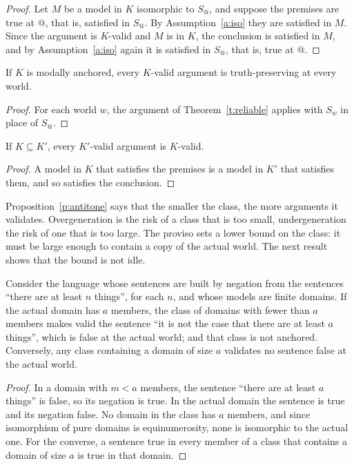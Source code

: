 \documentclass{situationist-preprint}
\begin{document}
\begin{proof}
Let $M$ be a model in $K$ isomorphic to $S_@$, and suppose the premises are true at $@$, that is, satisfied in $S_@$. By Assumption~\ref{a:iso} they are satisfied in $M$. Since the argument is $K$-valid and $M$ is in $K$, the conclusion is satisfied in $M$, and by Assumption~\ref{a:iso} again it is satisfied in $S_@$, that is, true at $@$.
\end{proof}

\begin{corollary}\label{c:nec}
If $K$ is modally anchored, every $K$-valid argument is truth-preserving at every world.
\end{corollary}

\begin{proof}
For each world $w$, the argument of Theorem~\ref{t:reliable} applies with $S_w$ in place of $S_@$.
\end{proof}

\begin{proposition}\label{p:antitone}
If $K \subseteq K'$, every $K'$-valid argument is $K$-valid.
\end{proposition}

\begin{proof}
A model in $K$ that satisfies the premises is a model in $K'$ that satisfies them, and so satisfies the conclusion.
\end{proof}

Proposition~\ref{p:antitone} says that the smaller the class, the more arguments it validates. Overgeneration is the risk of a class that is too small, undergeneration the risk of one that is too large. The proviso sets a lower bound on the class: it must be large enough to contain a copy of the actual world. The next result shows that the bound is not idle.

\begin{proposition}\label{p:over}
Consider the language whose sentences are built by negation from the sentences \enquote{there are at least $n$ things}, for each $n$, and whose models are finite domains. If the actual domain has $a$ members, the class of domains with fewer than $a$ members makes valid the sentence \enquote{it is not the case that there are at least $a$ things}, which is false at the actual world; and that class is not anchored. Conversely, any class containing a domain of size $a$ validates no sentence false at the actual world.
\end{proposition}

\begin{proof}
In a domain with $m < a$ members, the sentence \enquote{there are at least $a$ things} is false, so its negation is true. In the actual domain the sentence is true and its negation false. No domain in the class has $a$ members, and since isomorphism of pure domains is equinumerosity, none is isomorphic to the actual one. For the converse, a sentence true in every member of a class that contains a domain of size $a$ is true in that domain.
\end{proof}
\end{document}
